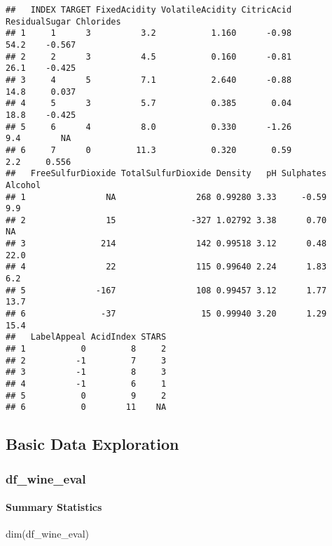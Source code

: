 \documentclass[
]{article}
\newenvironment{Shaded}{\begin{snugshade}}{\end{snugshade}}
\newcommand{\FunctionTok}[1]{\textcolor[rgb]{0.00,0.00,0.00}{#1}}
\newcommand{\NormalTok}[1]{#1}
\begin{document}
\begin{verbatim}
##   INDEX TARGET FixedAcidity VolatileAcidity CitricAcid ResidualSugar Chlorides
## 1     1      3          3.2           1.160      -0.98          54.2    -0.567
## 2     2      3          4.5           0.160      -0.81          26.1    -0.425
## 3     4      5          7.1           2.640      -0.88          14.8     0.037
## 4     5      3          5.7           0.385       0.04          18.8    -0.425
## 5     6      4          8.0           0.330      -1.26           9.4        NA
## 6     7      0         11.3           0.320       0.59           2.2     0.556
##   FreeSulfurDioxide TotalSulfurDioxide Density   pH Sulphates Alcohol
## 1                NA                268 0.99280 3.33     -0.59     9.9
## 2                15               -327 1.02792 3.38      0.70      NA
## 3               214                142 0.99518 3.12      0.48    22.0
## 4                22                115 0.99640 2.24      1.83     6.2
## 5              -167                108 0.99457 3.12      1.77    13.7
## 6               -37                 15 0.99940 3.20      1.29    15.4
##   LabelAppeal AcidIndex STARS
## 1           0         8     2
## 2          -1         7     3
## 3          -1         8     3
## 4          -1         6     1
## 5           0         9     2
## 6           0        11    NA
\end{verbatim}

\hypertarget{basic-data-exploration}{%
\subsection{Basic Data Exploration}\label{basic-data-exploration}}

\hypertarget{df_wine_eval}{%
\subsubsection{df\_wine\_eval}\label{df_wine_eval}}

\hypertarget{summary-statistics}{%
\paragraph{Summary Statistics}\label{summary-statistics}}

\begin{Shaded}
\begin{Highlighting}[]
\FunctionTok{dim}\NormalTok{(df\_wine\_eval)}
\end{Highlighting}
\end{Shaded}
\end{document}
